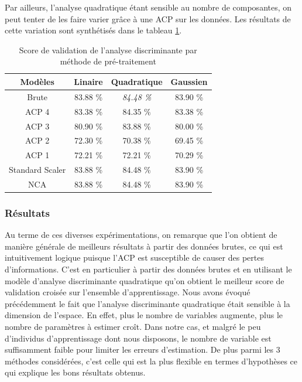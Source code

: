 \documentclass[twocolumn,10pt]{article}
\begin{document}
Par ailleurs, l'analyse quadratique étant sensible au nombre de composantes, on peut tenter de les faire varier grâce à une ACP sur les données. Les résultats de cette variation sont synthétisés dans le tableau \ref{tab:accuracy_analyse_discriminante}.

\begin{table}[htbp]
    \begin{center}
        \caption{\label{tab:accuracy_analyse_discriminante}Score de validation de l'analyse discriminante par méthode de pré-traitement}
        \begin{tabular}{c|ccc}
          Modèles & Linaire & Quadratique & Gaussien \\
            \hline
            Brute & 83.88 \% & \textit{84.48 \%} & 83.90 \% \\
            ACP 4 & 83.38 \% & 84.35 \% & 83.38 \% \\
            ACP 3 & 80.90 \% & 83.88 \% & 80.00 \% \\
            ACP 2 & 72.30 \% & 70.38 \% & 69.45 \% \\
            ACP 1 & 72.21 \% & 72.21 \% & 70.29 \% \\
            Standard Scaler & 83.88 \% & 84.48 \% & 83.90 \% \\
            NCA & 83.88 \% & 84.48 \% & 83.90 \% \\
        \end{tabular}
    \end{center}
\end{table}

\subsubsection{Résultats}

Au terme de ces diverses expérimentations, on remarque que l'on obtient de manière générale de meilleurs résultats à partir des données brutes, ce qui est intuitivement logique puisque l'ACP est susceptible de causer des pertes d'informations. C'est en particulier à partir des données brutes et en utilisant le modèle d'analyse discriminante quadratique qu'on obtient le meilleur score de validation croisée sur l'ensemble d'apprentissage. Nous avons évoqué précédemment le fait que l'analyse discriminante quadratique était sensible à la dimension de l'espace. En effet, plus le nombre de variables augmente, plus le nombre de paramètres à estimer croît. Dans notre cas, et malgré le peu d'individus d'apprentissage dont nous disposons, le nombre de variable est suffisamment faible pour limiter les erreurs d'estimation. De plus parmi les 3 méthodes considérées, c'est celle qui est la plus flexible en termes d'hypothèses ce qui explique les bons résultats obtenus.
\end{document}
